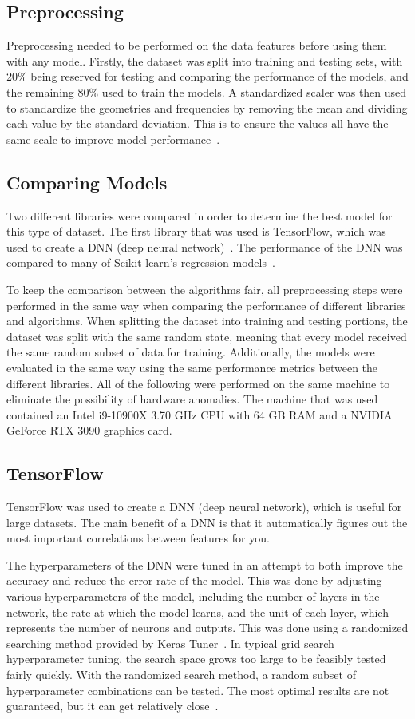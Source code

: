 \documentclass[conference]{IEEEtran}
\begin{document}
\subsection{Preprocessing}
Preprocessing needed to be performed on the data features before using them with any model. Firstly, the dataset was split into training and testing sets, with 20\% being reserved for testing and comparing the performance of the models, and the remaining 80\% used to train the models. A standardized scaler was then used to standardize the geometries and frequencies by removing the mean and dividing each value by the standard deviation. This is to ensure the values all have the same scale to improve model performance~\cite{9119820}. 


\subsection{Comparing Models}
Two different libraries were compared in order to determine the best model for this type of dataset. The first library that was used is TensorFlow, which was used to create a DNN (deep neural network)~\cite{tensorflow2015-whitepaper}. The performance of the DNN was compared to many of Scikit-learn's regression models~\cite{scikit-learn}.

To keep the comparison between the algorithms fair, all preprocessing steps were performed in the same way when comparing the performance of different libraries and algorithms. When splitting the dataset into training and testing portions, the dataset was split with the same random state, meaning that every model received the same random subset of data for training. Additionally, the models were evaluated in the same way using the same performance metrics between the different libraries. All of the following were performed on the same machine to eliminate the possibility of hardware anomalies. The machine that was used contained an Intel i9-10900X 3.70 GHz CPU with 64 GB RAM and a NVIDIA GeForce RTX 3090 graphics card. 


\subsection{TensorFlow}
TensorFlow was used to create a DNN (deep neural network), which is useful for large datasets. The main benefit of a DNN is that it automatically figures out the most important correlations between features for you. 

The hyperparameters of the DNN were tuned in an attempt to both improve the accuracy and reduce the error rate of the model. This was done by adjusting various hyperparameters of the model, including the number of layers in the network, the rate at which the model learns, and the unit of each layer, which represents the number of neurons and outputs. This was done using a randomized searching method provided by Keras Tuner~\cite{omalley2019kerastuner}. In typical grid search hyperparameter tuning, the search space grows too large to be feasibly tested fairly quickly. With the randomized search method, a random subset of hyperparameter combinations can be tested. The most optimal results are not guaranteed, but it can get relatively close~\cite{meanti_efficient_2022}. 
\end{document}
